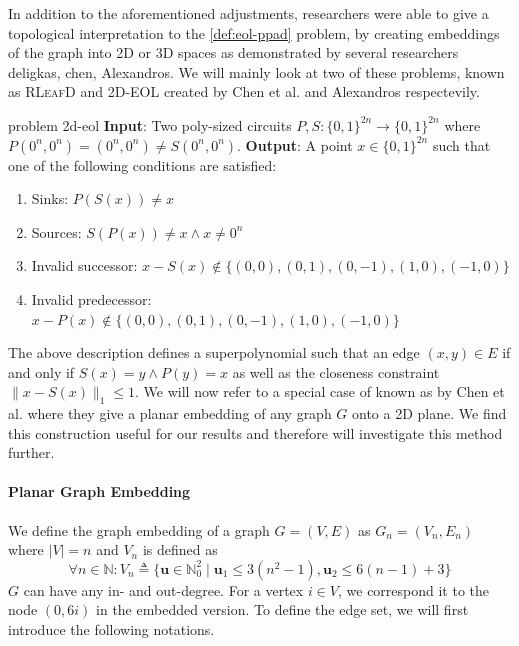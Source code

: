 In addition to the aforementioned adjustments, researchers were able to give a topological interpretation
to the  \ref{def:eol-ppad} problem, by creating embeddings of the graph
into 2D or 3D spaces as demonstrated by several researchers {deligkas, chen, Alexandros}.
We will mainly look at two of these problems, known as \textsc{RLeafD} and \textsc{2D-EOL}
created by Chen et al. and Alexandros respectevily.

\begin{definitionbox}{ problem {}}{2d-eol}
    \label{2d-eol}
    \textbf{Input}: Two poly-sized circuits $P,S: \{0,1\}^{2n} \to \{0,1\}^{2n}$ where $P(0^{n}, 0^{n}) = (0^{n},0^{n}) \neq S(0^{n}, 0^{n})$.
    \textbf{Output}: A point $x \in \{0,1\}^{2n}$ such that one of the following conditions are satisfied:
    \begin{enumerate}
        \item Sinks: $P(S(x)) \neq x$
        \item Sources: $S(P(x)) \neq  x \wedge x \neq 0^n$
        \item Invalid successor: $x - S(x) \not\in \{(0,0), (0,1), (0,-1), (1,0), (-1,0)\}$
        \item Invalid predecessor: $x - P(x) \not\in \{(0,0), (0,1), (0,-1), (1,0), (-1,0)\}$
    \end{enumerate}
\end{definitionbox}

The above description defines a superpolynomial such that an edge $(x,y) \in E$
if and only if $S(x) = y \wedge P(y) = x$ as well as the closeness constraint $\|x-S(x)\|_1 \leq 1$.
We will now refer to a special case of   known as  by Chen et al. where
they give a planar embedding of any graph $G$ onto a 2D plane. We find this construction useful for our results
and therefore will investigate this method further.

\paragraph{Planar Graph Embedding}
We define the graph embedding of a graph $G = (V,E)$ as $G_n = (V_n, E_n)$ where $|V| = n$ and $V_n$ is defined as
\[
    \forall n \in \mathbb{N}:  V_n \triangleq \Big\{\mathbf{u} \in \mathbb{N}_0^2\mid \mathbf{u}_1 \leq 3(n^2 - 1) , \mathbf{u}_2 \leq 6(n - 1) + 3 \Big\}
\]
$G$ can have any in- and out-degree.
For a vertex $i \in V$, we correspond it to the node $(0, 6i)$ in the embedded version.
To define the edge set, we will first introduce the following notations.

